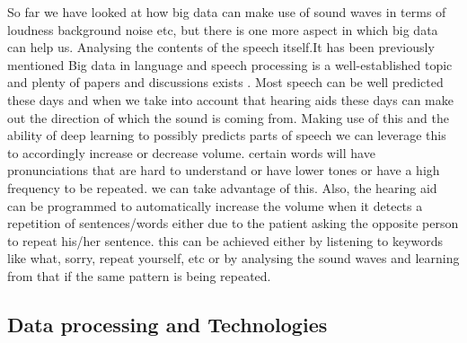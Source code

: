 \documentclass[sigconf]{acmart}
\begin{document}
So far we have looked at how big data can make use of sound waves in terms of loudness background noise etc, but there is one more aspect in which big data can help us. Analysing the contents of the speech itself.It has been previously mentioned Big data in language and speech processing is a well-established topic and plenty of papers and discussions exists \cite{Chung2017} \cite{Schuller2015}. Most speech can be well predicted these days and when we take into account that hearing aids these days can make out the direction of which the sound is coming from. Making use of this and the ability of deep learning to possibly predicts parts of speech we can leverage this to accordingly increase or decrease volume. certain words will have pronunciations that are hard to understand or have lower tones or have a high frequency to be repeated. we can take advantage of this. Also, the hearing aid can be programmed to automatically increase the volume when it detects a repetition of sentences/words either due to the patient asking the opposite person to repeat his/her sentence. this can be achieved either by listening to keywords like what, sorry, repeat yourself, etc or by analysing the sound waves and learning from that if the same pattern is being repeated. 

\subsection{Data processing and Technologies}
 
\end{document}
